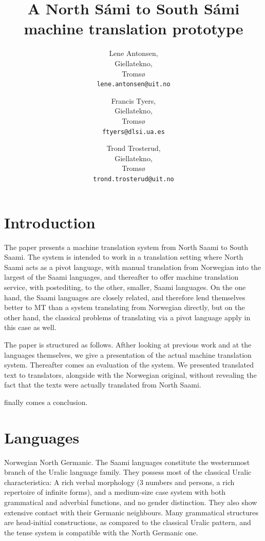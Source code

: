\documentclass[a4paper,11pt,twocolumn]{article}
\title{A North Sámi to South Sámi machine translation prototype}
\author{Lene Antonsen,\\Giellatekno,\\Tromsø\\{\tt lene.antonsen@uit.no}
\and Francis Tyers,\\Giellatekno,\\Tromsø\\{\tt ftyers@dlsi.ua.es}
\and Trond Trosterud,\\Giellatekno,\\Tromsø\\{\tt trond.trosterud@uit.no}}
\date{}
\begin{document}
\maketitle

\section{Introduction}

The paper presents a machine translation system from North Saami to
South Saami. The system is intended to work in a translation setting
where North Saami acts as a pivot language, with manual translation
from Norwegian into the largest of the Saami languages, and thereafter
to offer machine translation service, with postediting, to the other,
smaller, Saami languages. On the one hand, the Saami languages are
closely related, and therefore lend themselves better to MT than a
system translating from Norwegian directly, but on the other hand, the
classical problems of translating via a pivot language apply in this
case as well. 

The paper is structured as follows. Afther looking at previous work
and at the languages themselves, we give a presentation of the actual
machine translation system. Thereafter comes an evaluation of the
system. We presented translated text to translators, alongside with
the Norwegian original, without revealing the fact that the texts were
actually translated from North Saami.

finally comes a conclusion.


\cite{tyers09} \cite{wiechetek10} \cite{trosterud12}

\cite{babych2007}

\section{Languages}

Norwegian North Germanic. The Saami languages constitute the
westernmost branch of the Uralic language family. They possess most of
the classical Uralic characteristica: A rich verbal morphology (3
numbers and persons, a rich repertoire of infinite forms), and a
medium-size case system with both grammatical and adverbial functions,
and no gender distinction. They also show extensive contact with their
Germanic neighbours. Many grammatical structures are head-initial
constructions, as compared to the classical Uralic pattern, and the
tense system is compatible with the North Germanic one.
\end{document}
